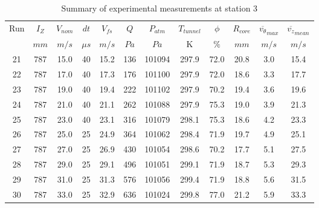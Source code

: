 \begin{table}[H]
\begin{center}
\begin{tabular}{|cccccccccccc|}
	\hline
	Run & $I_Z$ & $V_{nom}$ & $dt$ & $V_{fs}$ & $Q$ & $P_{atm}$ & $T_{tunnel}$ & $\phi$ & $R_{core}$ & $\overline{v_{\theta}}_{max}$ & $\overline{v_{z}}_{mean}$\\
	  & $mm$ & $m/s$ & $\mu s$ & $m/s$ & $Pa$ & $Pa$ & K & $\%$ & $mm$ & $m/s$ & $m/s$\\
	\hline
	21 & 787 & 15.0 & 40 & 15.2 & 136 & 101094 & 297.9 & 72.0 & 20.8 & 3.0 & 15.4\\
	22 & 787 & 17.0 & 40 & 17.3 & 176 & 101100 & 297.9 & 72.0 & 18.6 & 3.3 & 17.7\\
	23 & 787 & 19.0 & 40 & 19.4 & 222 & 101102 & 297.9 & 70.2 & 19.4 & 3.6 & 19.6\\
	24 & 787 & 21.0 & 40 & 21.1 & 262 & 101088 & 297.9 & 75.3 & 19.0 & 3.9 & 21.3\\
	25 & 787 & 23.0 & 40 & 23.1 & 316 & 101079 & 298.1 & 75.3 & 18.6 & 4.2 & 23.3\\
	26 & 787 & 25.0 & 25 & 24.9 & 364 & 101062 & 298.4 & 71.9 & 19.7 & 4.9 & 25.1\\
	27 & 787 & 27.0 & 25 & 26.9 & 430 & 101054 & 298.6 & 70.2 & 17.7 & 5.1 & 27.5\\
	28 & 787 & 29.0 & 25 & 29.1 & 496 & 101051 & 299.1 & 71.9 & 18.7 & 5.3 & 29.3\\
	29 & 787 & 31.0 & 25 & 31.3 & 576 & 101056 & 299.4 & 71.9 & 18.8 & 5.6 & 31.5\\
	30 & 787 & 33.0 & 25 & 32.9 & 636 & 101024 & 299.8 & 77.0 & 21.2 & 5.9 & 33.3\\
	\hline
\end{tabular}
\caption{Summary of experimental measurements at station 3}
\label{table:experiment_results_3}
\end{center}
\end{table}
